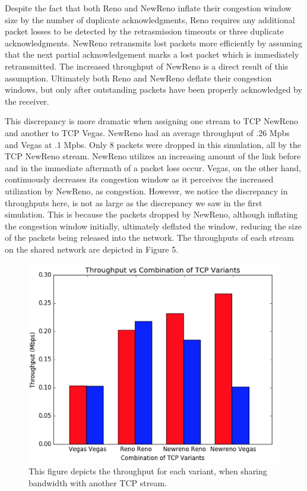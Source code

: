Despite the fact that both Reno and NewReno inflate their congestion window size by the number of duplicate acknowledgments, Reno requires any additional packet losses to be detected by the retrasmission timeouts or three duplicate acknowledgments. NewReno retransmits lost packets more efficiently by assuming that the next partial acknowledgement marks a lost packet which is immediately retransmitted. The increased throughput of NewReno is a direct result of this assumption. Ultimately both Reno and NewReno deflate their congestion windows, but only after outstanding packets have been properly acknowledged by the receiver.

This discrepancy is more dramatic when assigning one stream to TCP NewReno and another to TCP Vegas. NewReno had an average throughput of .26 Mpbs and Vegas at .1 Mpbs. Only 8 packets were dropped in this simulation, all by the TCP NewReno stream. NewReno utilizes an increasing amount of the link before and in the immediate aftermath of a packet loss occur. Vegas, on the other hand, continuously decreases its congestion window as it perceives the increased utilization by NewReno, as congestion. However, we notice the discrepancy in throughputs here, is not as large as the discrepancy we saw in the first simulation. This is because the packets dropped by NewReno, although inflating the congestion window initially, ultimately deflated the window, reducing the size of the packets being released into the network. The throughputs of each stream on the shared network are depicted in Figure 5.

\begin{figure}[!htbp]
	\includegraphics[scale=0.3]{exp2_tp.png}
	\caption{This figure depicts the throughput for each variant, when sharing bandwidth with another TCP stream.}
	\label{a:label}
\end{figure}



